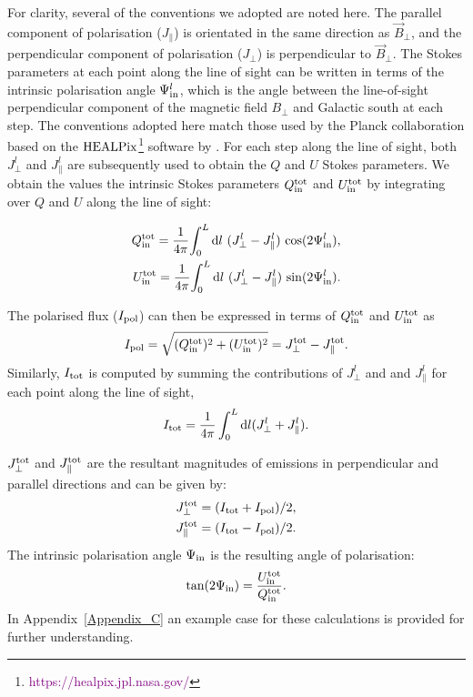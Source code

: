 \documentclass[usenatbib]{mnras}
\begin{document}
For clarity, several of the conventions we adopted are noted here. The parallel component of polarisation (${J_{\parallel}}$) is orientated in the same direction as  $\vec{B}_{\perp}$, and the perpendicular component of polarisation (${J_{\perp}}$) is perpendicular to $\vec{B}_{\perp}$. The Stokes parameters at each point along the line of sight can be written in terms of the intrinsic polarisation angle $\Psi^l_{\rm in}$, which is the angle between the line-of-sight perpendicular component of the magnetic field $B_{\perp}$ and Galactic south at each step. The conventions adopted here match those used by the Planck collaboration \citep{Planck_XIX} based on the $\rm HEALPix$\footnote{\textcolor{purple}{https://healpix.jpl.nasa.gov/}} software by \cite{Healpix_2005}. For each step along the line of sight, both  ${J_{\perp}^l}$ and ${J_{\parallel}^l}$ are subsequently used to obtain the $Q$ and $U$ Stokes parameters. We obtain the values the intrinsic Stokes parameters $Q^{\rm tot}_{\rm in}$ and $U^{\rm tot}_{\rm in}$ by integrating over $Q$ and $U$ along the line of sight:

\begin{eqnarray}
Q_{\rm in}^{\rm tot} = \frac{1}{4\pi} {\int_0^L \mathrm{d}l \ ({J_{\perp}^l} - J_{\parallel}^l) \ {\cos}(2\Psi^l_{\rm in}) }, \\
U_{\rm in}^{\rm tot} =\frac{1}{4\pi} {\int_0^L \mathrm{d}l \ ({J_{\perp}^l} - J_{\parallel}^l) \ {\sin}(2\Psi^l_{\rm in})}.
\end{eqnarray}

The polarised flux ($I_{\rm pol}$) can then be expressed in terms of ${Q_{\rm in}^{\rm tot}}$ and ${U_{\rm in}^{\rm tot}}$ as
\begin{eqnarray} \label{eq_I_pol}
I_{\rm pol} = \sqrt{(Q_{\rm in}^{\rm tot})^2+(U_{\rm in}^{\rm tot})^2} = J_{\perp}^{\rm tot} - J_{\parallel}^{\rm tot}.
\end{eqnarray}
Similarly, $I_{\rm tot}$ is computed by summing the contributions of $J_{\perp}^l$ and and $J_{\parallel}^l$ for each point along the line of sight,
\begin{equation} \label{eq_I_tot}
    I_{\rm tot} = \frac{1}{4\pi} \int_0^L \mathrm{d}l (J_{\perp}^l + J_{\parallel}^l).
\end{equation}

$J_{\perp}^{\rm tot}$ and $J_{\parallel}^{\rm tot}$ are the resultant magnitudes of emissions in perpendicular and parallel directions and can be given by:
\begin{eqnarray}
J_{\perp}^{\rm tot} = (I_{\rm tot} + I_{\rm pol})/2, \\
J_{\parallel}^{\rm tot} = (I_{\rm tot} - I_{\rm pol})/2. 
\end{eqnarray}
The intrinsic polarisation angle $\Psi_{\rm in}$ is the resulting angle of polarisation:
\begin{eqnarray}
\tan(2\Psi_{\rm in}) = \frac{U_{\rm in}^{\rm tot}}{Q_{\rm in}^{\rm tot}}. 
\end{eqnarray}
In Appendix~\ref{Appendix_C} an example case for these calculations is provided for further understanding.
\end{document}
